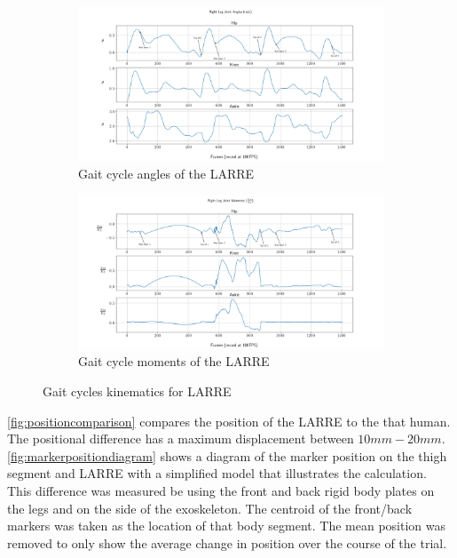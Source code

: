 \begin{figure}
    \begin{subfigure}{\textwidth}
        \centering
        \captionsetup{justification=centering}
        \centerline{
        \includegraphics[width=\textwidth, frame]{images/mech_design/exo_joint_angles.png}}
        \caption[LARRE gait cycle angles]{Gait cycle angles of the LARRE}
        \label{fig:larregaitangles}
    \end{subfigure}
    \begin{subfigure}{\textwidth}
        \centering
        \captionsetup{justification=centering}
        \centerline{
        \includegraphics[width=\textwidth, frame]{images/mech_design/exo_joint_moments.png}}
        \caption[LARRE gait cycle moments]{Gait cycle moments of the LARRE}
        \label{fig:larregaitmoments}
    \end{subfigure}
    \caption{Gait cycles kinematics for LARRE}
    \label{fig:exojointkin}
\end{figure}




\autoref{fig:positioncomparison} compares the position of the LARRE to the that human. The positional difference has a maximum displacement between $10mm-20mm$. \autoref{fig:markerpositiondiagram} shows a diagram of the marker position on the thigh segment and LARRE with a simplified model that illustrates the calculation.  This difference was measured be using the front and back rigid body plates on the legs and on the side of the exoskeleton. The centroid of the front/back markers was taken as the location of that body segment. The mean position was removed to only show the average change in position over the course of the trial.  

